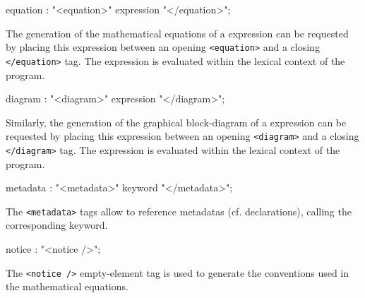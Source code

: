 \documentclass[a4paper,10pt]{book}
\begin{document}
\begin{rail}
equation : "<equation>" expression "</equation>";
\end{rail}

The generation of the mathematical equations of a \faust expression can be requested by placing this expression between an opening \lstinline'<equation>' and a closing \lstinline'</equation>' tag. The expression is evaluated within the lexical context of the \faust program.


\begin{rail}
diagram : "<diagram>" expression "</diagram>";
\end{rail}

Similarly, the generation of the graphical block-diagram of a \faust expression can be requested by placing this expression between an opening \lstinline'<diagram>' and a closing \lstinline'</diagram>' tag. The expression is evaluated within the lexical context of the \faust program.



\begin{rail}
metadata : "<metadata>" keyword "</metadata>";
\end{rail}


The \lstinline'<metadata>' tags allow to reference \faust metadatas (cf. declarations), calling the corresponding keyword.


\begin{rail}
notice : "<notice />";
\end{rail}

The \lstinline'<notice />' empty-element tag is used to generate the conventions used in the mathematical equations.
% 
\end{document}

